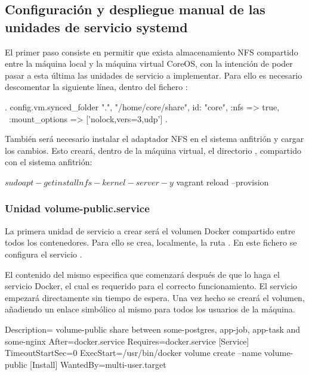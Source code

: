 \subsection{Configuración y despliegue manual de las unidades de servicio systemd}

El primer paso consiste en permitir que exista almacenamiento NFS compartido entre la máquina local y la máquina virtual CoreOS, con la intención de poder pasar a esta última las unidades de servicio a implementar. Para ello es necesario descomentar la siguiente línea, dentro del fichero :

\begin{codelisting}
\label{code:vagrantfile2}
\begin{code}
.
config.vm.synced_folder ".", "/home/core/share", id: "core", :nfs => true, \
:mount_options => ['nolock,vers=3,udp']
.
\end{code}
\end{codelisting}

También será necesario instalar el adaptador NFS en el sistema anfitrión y cargar los cambios. Esto creará, dentro de la máquina virtual, el directorio , compartido con el sistema anfitrión:

\begin{code}
$ sudo apt-get install nfs-kernel-server -y
$ vagrant reload --provision
\end{code}

\subsubsection{Unidad volume-public.service}

La primera unidad de servicio a crear será el volumen Docker compartido entre todos los contenedores. Para ello se crea, localmente, la ruta . En este fichero se configura el servicio . 

El contenido del mismo especifica que comenzará después de que lo haga el servicio Docker, el cual es requerido para el correcto funcionamiento. El servicio empezará directamente sin tiempo de espera. Una vez hecho se creará el volumen, añadiendo un enlace simbólico al mismo para todos los usuarios de la máquina. 

\begin{codelisting}
\label{code:volume-public.service}
\begin{code}
[Unit] 
  Description= volume-public share between some-postgres, app-job, app-task and 
               some-nginx 
  After=docker.service
  Requires=docker.service
[Service] 
  TimeoutStartSec=0 
  ExecStart=/usr/bin/docker volume create --name volume-public
[Install] 
  WantedBy=multi-user.target
\end{code}
\end{codelisting}

